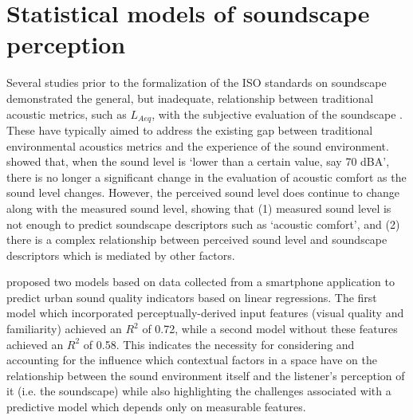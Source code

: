 \section{Statistical models of soundscape perception}
Several studies prior to the formalization of the ISO standards on soundscape demonstrated the general, but inadequate, relationship between traditional acoustic metrics, such as $L_{Aeq}$, with the subjective evaluation of the soundscape \citep{Berglund2006Tool,Yang2005Acoustic,Rychtarikova2013Soundscape,Aumond2017Modeling,AlsinaPages2021Perceptual}. These have typically aimed to address the existing gap between traditional environmental acoustics metrics and the experience of the sound environment. \citet{Yang2005Acoustic} showed that, when the sound level is `lower than a certain value, say 70 dBA', there is no longer a significant change in the evaluation of acoustic comfort as the sound level changes. However, the perceived sound level does continue to change along with the measured sound level, showing that (1) measured sound level is not enough to predict soundscape descriptors such as `acoustic comfort', and (2) there is a complex relationship between perceived sound level and soundscape descriptors which is mediated by other factors.

\citet{Ricciardi2015Sound} proposed two models based on data collected from a smartphone application to predict urban sound quality indicators based on linear regressions. The first model which incorporated perceptually-derived input features (visual quality and familiarity) achieved an $R^2$ of 0.72, while a second model without these features achieved an $R^2$ of 0.58. This indicates the necessity for considering and accounting for the influence which contextual factors in a space have on the relationship between the sound environment itself and the listener's perception of it (i.e. the soundscape) while also highlighting the challenges associated with a predictive model which depends only on measurable features.


